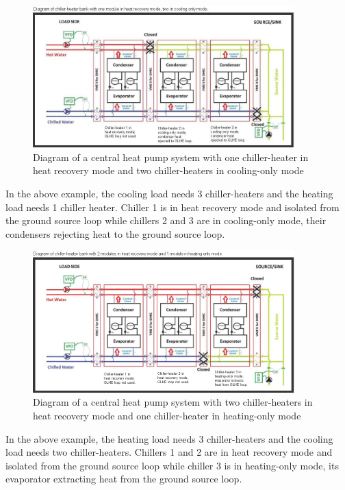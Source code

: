 \begin{figure}[hbtp] %
    \centering
    \includegraphics[width=0.9\textwidth, height=0.9\textheight, keepaspectratio=true]{media/image187.png}
    \caption{Diagram of a central heat pump system with one chiller-heater in heat recovery mode and two chiller-heaters in cooling-only mode \protect \label{fig:diagram-of-a-central-heat-pump-system-with-002}}
\end{figure}

In the above example, the cooling load needs 3 chiller-heaters and the heating load needs 1 chiller heater. Chiller 1 is in heat recovery mode and isolated from the ground source loop while chillers 2 and 3 are in cooling-only mode, their condensers rejecting heat to the ground source loop.

\begin{figure}[hbtp] %
    \centering
    \includegraphics[width=0.9\textwidth, height=0.9\textheight, keepaspectratio=true]{media/image188.png}
    \caption{Diagram of a central heat pump system with two chiller-heaters in heat recovery mode and one chiller-heater in heating-only mode \protect \label{fig:diagram-of-a-central-heat-pump-system-with-003}}
\end{figure}

In the above example, the heating load needs 3 chiller-heaters and the cooling load needs two chiller-heaters. Chillers 1 and 2 are in heat recovery mode and isolated from the ground source loop while chiller 3 is in heating-only mode, its evaporator extracting heat from the ground source loop.

